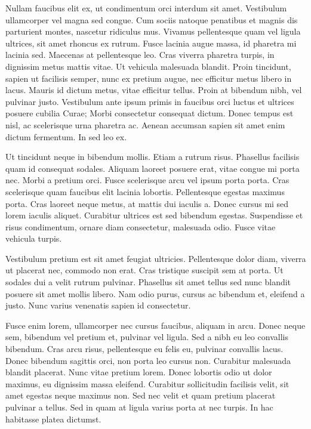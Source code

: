 \documentclass{llncs}
\begin{document}
Nullam faucibus elit ex, ut condimentum orci interdum sit amet. Vestibulum ullamcorper vel magna sed congue. Cum sociis natoque penatibus et magnis dis parturient montes, nascetur ridiculus mus. Vivamus pellentesque quam vel ligula ultrices, sit amet rhoncus ex rutrum. Fusce lacinia augue massa, id pharetra mi lacinia sed. Maecenas at pellentesque leo. Cras viverra pharetra turpis, in dignissim metus mattis vitae. Ut vehicula malesuada blandit. Proin tincidunt, sapien ut facilisis semper, nunc ex pretium augue, nec efficitur metus libero in lacus. Mauris id dictum metus, vitae efficitur tellus. Proin at bibendum nibh, vel pulvinar justo. Vestibulum ante ipsum primis in faucibus orci luctus et ultrices posuere cubilia Curae; Morbi consectetur consequat dictum. Donec tempus est nisl, ac scelerisque urna pharetra ac. Aenean accumsan sapien sit amet enim dictum fermentum. In sed leo ex.

Ut tincidunt neque in bibendum mollis. Etiam a rutrum risus. Phasellus facilisis quam id consequat sodales. Aliquam laoreet posuere erat, vitae congue mi porta nec. Morbi a pretium orci. Fusce scelerisque arcu vel ipsum porta porta. Cras scelerisque quam faucibus elit lacinia lobortis. Pellentesque egestas maximus porta. Cras laoreet neque metus, at mattis dui iaculis a. Donec cursus mi sed lorem iaculis aliquet. Curabitur ultrices est sed bibendum egestas. Suspendisse et risus condimentum, ornare diam consectetur, malesuada odio. Fusce vitae vehicula turpis.

Vestibulum pretium est sit amet feugiat ultricies. Pellentesque dolor diam, viverra ut placerat nec, commodo non erat. Cras tristique suscipit sem at porta. Ut sodales dui a velit rutrum pulvinar. Phasellus sit amet tellus sed nunc blandit posuere sit amet mollis libero. Nam odio purus, cursus ac bibendum et, eleifend a justo. Nunc varius venenatis sapien id consectetur.

Fusce enim lorem, ullamcorper nec cursus faucibus, aliquam in arcu. Donec neque sem, bibendum vel pretium et, pulvinar vel ligula. Sed a nibh eu leo convallis bibendum. Cras arcu risus, pellentesque eu felis eu, pulvinar convallis lacus. Donec bibendum sagittis orci, non porta leo cursus non. Curabitur malesuada blandit placerat. Nunc vitae pretium lorem. Donec lobortis odio ut dolor maximus, eu dignissim massa eleifend. Curabitur sollicitudin facilisis velit, sit amet egestas neque maximus non. Sed nec velit et quam pretium placerat pulvinar a tellus. Sed in quam at ligula varius porta at nec turpis. In hac habitasse platea dictumst.
\end{document}
